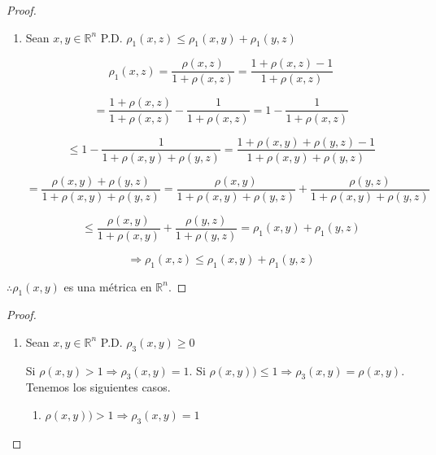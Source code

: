 \documentclass[12pt]{article}
\newcommand{\subscript}[2]{$#1 _ #2$}
\begin{document}
\begin{enumerate}[label=\textbf{\arabic*}.]
\begin{proof}
\begin{enumerate}[label=(\subscript{D}{{\arabic*}})]
\item  Sean $x,y \in \mathbb{R}^{n}$ P.D. ${\rho}_{1}(x,z) \leqslant {\rho}_{1}(x,y) +{\rho}_{1}(y,z)$

\begin{equation*}
    {\rho}_{1}(x,z) =\frac{{\rho}(x,z)}{1+{\rho}(x,z)} = \frac{1+{\rho}(x,z)-1}{1+{\rho}(x,z)}
\end{equation*}

\begin{equation*}
    = \frac{1+{\rho}(x,z)}{1+{\rho}(x,z)}-\frac{1}{1+{\rho}(x,z)}=1-\frac{1}{1+{\rho}(x,z)}
\end{equation*}

\begin{equation*}
    \leqslant 1-\frac{1}{1+{\rho}(x,y)+{\rho}(y,z)}=\frac{1+{\rho}(x,y)+{\rho}(y,z)-1}{1+{\rho}(x,y)+{\rho}(y,z)}
\end{equation*}

\begin{equation*}
    =\frac{{\rho}(x,y)+{\rho}(y,z)}{1+{\rho}(x,y)+{\rho}(y,z)}=\frac{{\rho}(x,y)}{1+{\rho}(x,y)+{\rho}(y,z)}+\frac{{\rho}(y,z)}{1+{\rho}(x,y)+{\rho}(y,z)}
\end{equation*}

\begin{equation*}
    \leqslant \frac{{\rho}(x,y)}{1+{\rho}(x,y)}+\frac{{\rho}(y,z)}{1+{\rho}(y,z)}={\rho}_{1}(x,y)+{\rho}_{1}(y,z) 
\end{equation*}

\begin{equation*}
    \Rightarrow {\rho}_{1}(x,z) \leqslant {\rho}_{1}(x,y)+{\rho}_{1}(y,z)
\end{equation*}
\end{enumerate}

$\therefore {\rho}_{1}(x,y)$ es una métrica en $\mathbb{R}^{n}$.
\end{proof}

\begin{proof}
\begin{enumerate}[label=(\subscript{D}{{\arabic*}})]
\item  Sean $x,y \in \mathbb{R}^{n}$ P.D. ${\rho}_{3}(x,y) \geqslant 0$

Si $\rho(x,y)>1 \Rightarrow {\rho}_{3}(x,y)=1$. Si  $\rho(x,y))\leqslant 1 \Rightarrow {\rho}_{3}(x,y)=\rho(x,y)$. Tenemos los siguientes casos.

\begin{enumerate}[label=\alph*)]
    
\item  $\rho(x,y)) > 1 \Rightarrow {\rho}_{3}(x,y)=1 $


\end{enumerate}
\end{enumerate}
\end{proof}
\end{enumerate}
\end{document}
